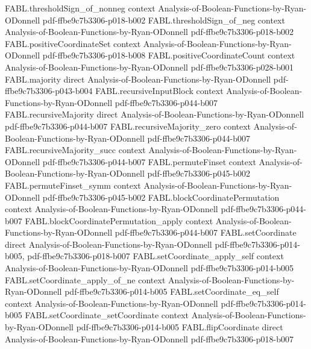 \begin{theorem}
\proofstep
  {FABL.thresholdSign_of_nonneg}
  {context}
  {Analysis-of-Boolean-Functions-by-Ryan-ODonnell}
  {pdf-ffbe9c7b3306-p018-b002}
\proofstep
  {FABL.thresholdSign_of_neg}
  {context}
  {Analysis-of-Boolean-Functions-by-Ryan-ODonnell}
  {pdf-ffbe9c7b3306-p018-b002}
\proofstep
  {FABL.positiveCoordinateSet}
  {context}
  {Analysis-of-Boolean-Functions-by-Ryan-ODonnell}
  {pdf-ffbe9c7b3306-p018-b008}
\proofstep
  {FABL.positiveCoordinateCount}
  {context}
  {Analysis-of-Boolean-Functions-by-Ryan-ODonnell}
  {pdf-ffbe9c7b3306-p028-b001}
\proofstep
  {FABL.majority}
  {direct}
  {Analysis-of-Boolean-Functions-by-Ryan-ODonnell}
  {pdf-ffbe9c7b3306-p043-b004}
\proofstep
  {FABL.recursiveInputBlock}
  {context}
  {Analysis-of-Boolean-Functions-by-Ryan-ODonnell}
  {pdf-ffbe9c7b3306-p044-b007}
\proofstep
  {FABL.recursiveMajority}
  {direct}
  {Analysis-of-Boolean-Functions-by-Ryan-ODonnell}
  {pdf-ffbe9c7b3306-p044-b007}
\proofstep
  {FABL.recursiveMajority_zero}
  {context}
  {Analysis-of-Boolean-Functions-by-Ryan-ODonnell}
  {pdf-ffbe9c7b3306-p044-b007}
\proofstep
  {FABL.recursiveMajority_succ}
  {context}
  {Analysis-of-Boolean-Functions-by-Ryan-ODonnell}
  {pdf-ffbe9c7b3306-p044-b007}
\proofstep
  {FABL.permuteFinset}
  {context}
  {Analysis-of-Boolean-Functions-by-Ryan-ODonnell}
  {pdf-ffbe9c7b3306-p045-b002}
\proofstep
  {FABL.permuteFinset_symm}
  {context}
  {Analysis-of-Boolean-Functions-by-Ryan-ODonnell}
  {pdf-ffbe9c7b3306-p045-b002}
\proofstep
  {FABL.blockCoordinatePermutation}
  {context}
  {Analysis-of-Boolean-Functions-by-Ryan-ODonnell}
  {pdf-ffbe9c7b3306-p044-b007}
\proofstep
  {FABL.blockCoordinatePermutation_apply}
  {context}
  {Analysis-of-Boolean-Functions-by-Ryan-ODonnell}
  {pdf-ffbe9c7b3306-p044-b007}
\proofstep
  {FABL.setCoordinate}
  {direct}
  {Analysis-of-Boolean-Functions-by-Ryan-ODonnell}
  {pdf-ffbe9c7b3306-p014-b005,
    pdf-ffbe9c7b3306-p018-b007}
\proofstep
  {FABL.setCoordinate_apply_self}
  {context}
  {Analysis-of-Boolean-Functions-by-Ryan-ODonnell}
  {pdf-ffbe9c7b3306-p014-b005}
\proofstep
  {FABL.setCoordinate_apply_of_ne}
  {context}
  {Analysis-of-Boolean-Functions-by-Ryan-ODonnell}
  {pdf-ffbe9c7b3306-p014-b005}
\proofstep
  {FABL.setCoordinate_eq_self}
  {context}
  {Analysis-of-Boolean-Functions-by-Ryan-ODonnell}
  {pdf-ffbe9c7b3306-p014-b005}
\proofstep
  {FABL.setCoordinate_setCoordinate}
  {context}
  {Analysis-of-Boolean-Functions-by-Ryan-ODonnell}
  {pdf-ffbe9c7b3306-p014-b005}
\proofstep
  {FABL.flipCoordinate}
  {direct}
  {Analysis-of-Boolean-Functions-by-Ryan-ODonnell}
  {pdf-ffbe9c7b3306-p018-b007}

\end{theorem}

